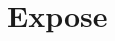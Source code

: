 \documentclass[paper=a4,fontsize=10pt,DIV=18,twocolumn,parskip=half]{scrartcl}
\numberwithin{equation}{section}    %
\begin{document}
\section{Expose}
%

\label{Expose}
%
%
%
%
%
%
%
%
%
%
%
\end{document}
